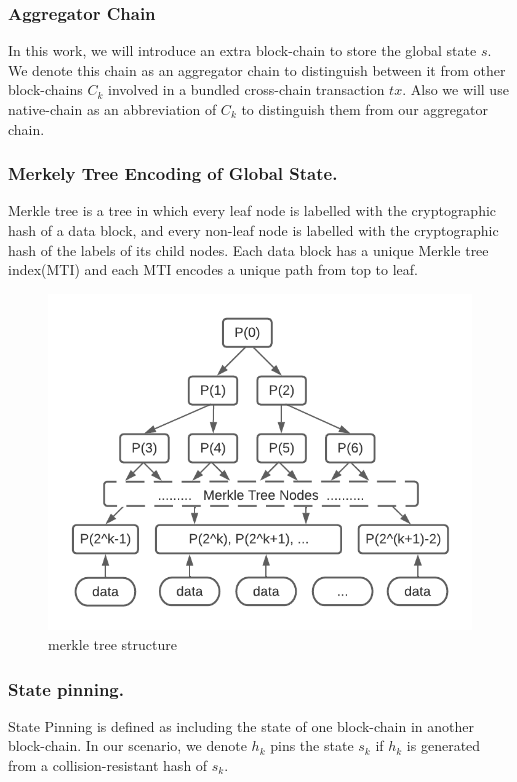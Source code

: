 \documentclass[pageno]{jpaper}
\begin{document}
\subsubsection{Aggregator Chain}
In this work, we will introduce an extra block-chain to store the global state $s$. We denote this chain as an aggregator chain to distinguish between it from other block-chains $C_{k}$ involved in a bundled cross-chain transaction $tx$. Also we will use native-chain as an abbreviation of $C_{k}$ to distinguish them from our aggregator chain.
\\
\subsubsection{Merkely Tree Encoding of Global State.}
Merkle\cite{becker2008merkle} tree is a tree in which every leaf node is labelled with the cryptographic hash of a data block, and every non-leaf node is labelled with the cryptographic hash of the labels of its child nodes. Each data block has a unique Merkle tree index(MTI) and each MTI encodes a unique path from top to leaf.\\

\begin{figure}[!ht]
\caption{merkle tree structure}
\label{merkle-tree}
\includegraphics[scale=0.6]{merkle-tree}
\end{figure}

\subsubsection{State pinning.}
State Pinning\cite{robinson2019anonymous} is defined as including the state of one block-chain in another block-chain. In our scenario, we denote $h_k$ pins the state $s_k$ if $h_k$ is generated from a collision-resistant hash of $s_k$.
\\
\end{document}

